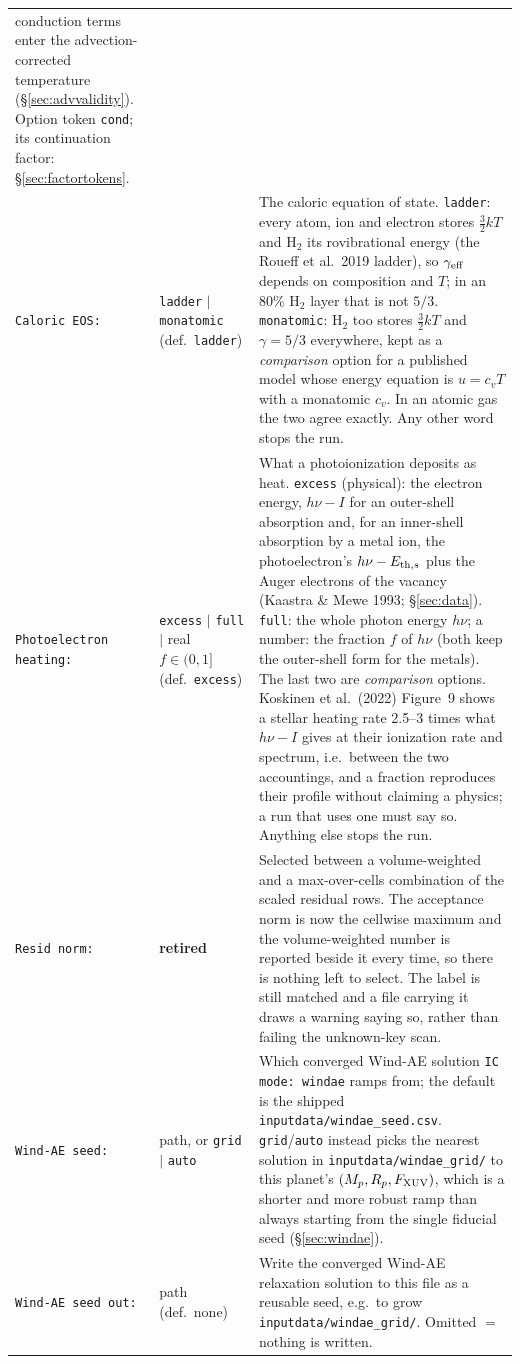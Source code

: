 \documentclass[english,a4paper]{my_memo}
\begin{document}
\begin{longtable}{@{}p{}p{}p{}@{}}
  conduction terms enter the advection-corrected temperature
  (\S\ref{sec:advvalidity}). Option token \texttt{cond}; its continuation
  factor: \S\ref{sec:factortokens}. \\
\texttt{Caloric EOS:} & \texttt{ladder} $|$ \texttt{monatomic}
  (def.\ \texttt{ladder}) & The caloric equation of state. \texttt{ladder}:
  every atom, ion and electron stores $\tfrac32 kT$ and H$_2$ its
  rovibrational energy (the Roueff et al.\ 2019 ladder), so $\gamma_{\rm eff}$
  depends on composition and $T$; in an 80\% H$_2$ layer that is not $5/3$.
  \texttt{monatomic}: H$_2$ too stores $\tfrac32 kT$ and $\gamma=5/3$
  everywhere, kept as a \emph{comparison} option for a published model whose
  energy equation is $u=c_vT$ with a monatomic $c_v$. In an atomic gas the two
  agree exactly. Any other word stops the run. \\
\texttt{Photoelectron heating:} & \texttt{excess} $|$ \texttt{full} $|$ real
  $f\in(0,1]$ (def.\ \texttt{excess}) & What a photoionization deposits as
  heat. \texttt{excess} (physical): the electron energy, $h\nu-I$ for an
  outer-shell absorption and, for an inner-shell absorption by a metal ion,
  the photoelectron's $h\nu-E_{{\rm th},s}$ plus the Auger electrons of the
  vacancy (Kaastra \& Mewe 1993; \S\ref{sec:data}).
  \texttt{full}: the whole photon energy $h\nu$; a number: the fraction $f$ of
  $h\nu$ (both keep the outer-shell form for the metals). The last two are
  \emph{comparison} options. Koskinen et al.\ (2022)
  Figure~9 shows a stellar heating rate 2.5--3 times what $h\nu-I$ gives at
  their ionization rate and spectrum, i.e.\ between the two accountings, and a
  fraction reproduces their profile without claiming a physics; a run that
  uses one must say so. Anything else stops the run. \\
\texttt{Resid norm:} & \textbf{retired} & Selected between a volume-weighted
  and a max-over-cells combination of the scaled residual rows. The acceptance
  norm is now the cellwise maximum and the volume-weighted number is reported
  beside it every time, so there is nothing left to select. The label is still
  matched and a file carrying it draws a warning saying so, rather than
  failing the unknown-key scan. \\
\texttt{Wind-AE seed:} & path, or \texttt{grid} $|$ \texttt{auto} & Which
  converged Wind-AE solution \texttt{IC mode: windae} ramps from; the default is
  the shipped \texttt{inputdata/}\allowbreak\texttt{windae\_seed.csv}.
  \texttt{grid}/\texttt{auto} instead picks the nearest solution in
  \texttt{inputdata/}\allowbreak\texttt{windae\_grid/} to this planet's
  $(M_p,R_p,F_{\rm XUV})$, which is a shorter and more robust ramp than always
  starting from the single fiducial seed (\S\ref{sec:windae}). \\
\texttt{Wind-AE seed out:} & path (def.\ none) & Write the converged Wind-AE
  relaxation solution to this file as a reusable seed, e.g.\ to grow
  \texttt{inputdata/windae\_grid/}. Omitted $=$ nothing is written. \\
\end{longtable}
\end{document}
